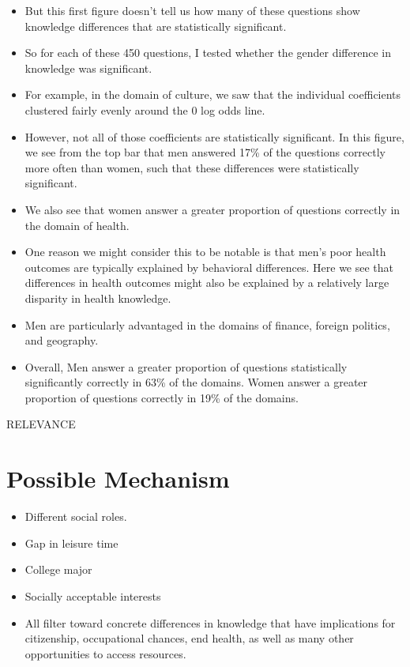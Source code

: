 \documentclass[]{article}
\begin{document}
\begin{itemize}
  \item{But this first figure doesn't tell us how many of these questions show knowledge differences that are statistically significant.}
  \item{So for each of these 450 questions, I tested whether the gender difference in knowledge was significant.}
  \item{For example, in the domain of culture, we saw that the individual coefficients clustered fairly evenly around the 0 log odds line.}
  \item{However, not all of those coefficients are statistically significant. In this figure, we see from the top bar that men answered 17\% of the questions correctly more often than women, such that these differences were statistically significant.}
  \vspace{5mm}
  \item{We also see that women answer a greater proportion of questions correctly in the domain of health.}
  \item{One reason we might consider this to be notable is that men's poor health outcomes are typically explained by behavioral differences. Here we see that differences in health outcomes might also be explained by a relatively large disparity in health knowledge.}
  \vspace{5mm}
  \item{Men are particularly advantaged in the domains of finance, foreign politics, and geography.}
  \item{Overall, Men answer a greater proportion of questions statistically significantly correctly in 63\% of the domains. Women answer a greater proportion of questions correctly in 19\% of the domains.}
\end{itemize}

\newpage
RELEVANCE
\section{Possible Mechanism}

\begin{itemize}
  \item{Different social roles.}
  \item{Gap in leisure time}
  \item{College major}
  \item{Socially acceptable interests}
  \item{All filter toward concrete differences in knowledge that have implications for citizenship, occupational chances, end health, as well as many other opportunities to access resources.}
\end{itemize}
\end{document}
